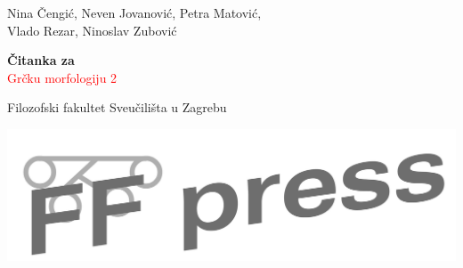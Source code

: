 \begin{titlepage} %

	\raggedleft %
	
	\vspace*{\baselineskip} %
	
	
	{\Large Nina Čengić, Neven Jovanović, Petra Matović, \\Vlado Rezar, Ninoslav Zubović} %
	
	\vspace*{0.167\textheight} %
	
	
	\textbf{\LARGE Čitanka za}\\[\baselineskip] %
	
	{\textcolor{Red}{\Huge Grčku morfologiju 2}}\\[\baselineskip] %
	
	
	\vfill %
	
	
	{\large Filozofski fakultet Sveučilišta u Zagrebu
	
	\medskip
	
\includegraphics[scale=0.20]{ffpress-cb.png} %

}
	
	\vspace*{3\baselineskip} %

\end{titlepage}



